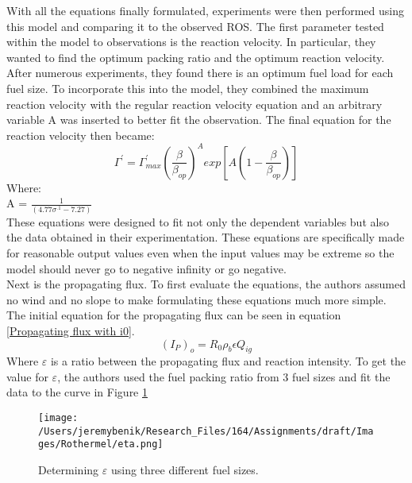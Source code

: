 \documentclass{article}
\begin{document}
\indent With all the equations finally formulated, experiments were then performed using this model and comparing it to the observed ROS. The first parameter tested within the model to observations is the reaction velocity. In particular, they wanted to find the optimum packing ratio and the optimum reaction velocity. After numerous experiments, they found there is an optimum fuel load for each fuel size. To incorporate this into the model, they combined the maximum reaction velocity with the regular reaction velocity equation and an arbitrary variable A was inserted to better fit the observation. The final equation for the reaction velocity then became: 
\begin{equation}
	\label{Final Reaction Velocity}
	\Gamma ^ {'} = \Gamma ^ {'}_{max} (\frac {\beta} {\beta _ {op}}) ^ {A} exp[A(1 - \frac {\beta} {\beta _ {op}})]
\end{equation}
Where: \\
A = $\frac {1} {(4.77 \sigma ^ {.1} - 7.27)}$\\
\indent These equations were designed to fit not only the dependent variables but also the data obtained in their experimentation. These equations are specifically made for reasonable output values even when the input values may be extreme so the model should never go to negative infinity or go negative. \\
\indent Next is the propagating flux. To first evaluate the equations, the authors assumed no wind and no slope to make formulating these equations much more simple. The initial equation for the propagating flux can be seen in equation \ref{Propagating flux with i0}.
\begin{equation}
	\label{Propagating flux with i0}
	(I_P)_o = R_0 \rho _ b \epsilon Q_{ig}
\end{equation}
Where $\varepsilon$ is a ratio between the propagating flux and reaction intensity. To get the value for $\varepsilon$, the authors used the fuel packing ratio from 3 fuel sizes and fit the data to the curve in Figure \ref{rothermel_eta}
\begin{figure}[h]
\centering
  \texttt{[image: /Users/jeremybenik/Research\_Files/164/Assignments/draft/Images/Rothermel/eta.png]}
  \caption{Determining $\varepsilon$ using three different fuel sizes.}
  \label{rothermel_eta}
\end{figure}
\end{document}
